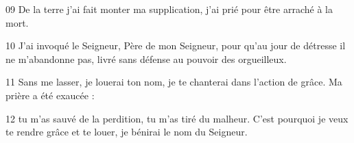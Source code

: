 
09 De la terre j’ai fait monter ma supplication, j’ai prié pour être arraché à la mort.

10 J’ai invoqué le Seigneur, Père de mon Seigneur, pour qu’au jour de détresse il ne m’abandonne pas, livré sans défense au pouvoir des orgueilleux.

11 Sans me lasser, je louerai ton nom, je te chanterai dans l’action de grâce. Ma prière a été exaucée :

12 tu m’as sauvé de la perdition, tu m’as tiré du malheur. C’est pourquoi je veux te rendre grâce et te louer, je bénirai le nom du Seigneur.
